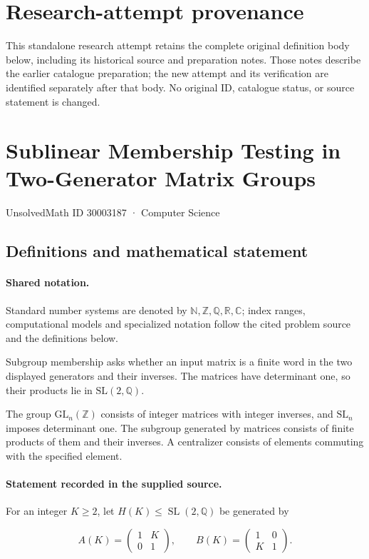 \documentclass[11pt]{article}
\begin{document}
\section*{Research-attempt provenance}
This standalone research attempt retains the complete original definition body below,
including its historical source and preparation notes. Those notes describe the
earlier catalogue preparation; the new attempt and its verification are identified
separately after that body. No original ID, catalogue status, or source statement is changed.

\section{Sublinear Membership Testing in Two-Generator Matrix Groups}\label{30003187}
{\small UnsolvedMath ID 30003187 · Computer Science}
\subsection{Definitions and mathematical statement}

\paragraph{Shared notation.}Standard number systems are denoted by $\mathbb N,\mathbb Z,\mathbb Q,\mathbb R,\mathbb C$; index ranges, computational models and specialized notation follow the cited problem source and the definitions below.


Subgroup membership asks whether an input matrix is a finite word in the two displayed generators and their inverses. The matrices have determinant one, so their products lie in $\mathrm{SL}(2,\mathbb Q)$.

The group $\mathrm{GL}_n(\mathbb Z)$ consists of integer matrices with integer inverses, and $\mathrm{SL}_n$ imposes determinant one. The subgroup generated by matrices consists of finite products of them and their inverses. A centralizer consists of elements commuting with the specified element.
\paragraph{Statement recorded in the supplied source.}
For an integer $K\geq2$, let $H(K)\leq\operatorname{SL}(2,\mathbb Q)$ be generated by

$$A(K)=\begin{pmatrix}1&K\\0&1\end{pmatrix},\qquad B(K)=\begin{pmatrix}1&0\\K&1\end{pmatrix}.$$
\end{document}
